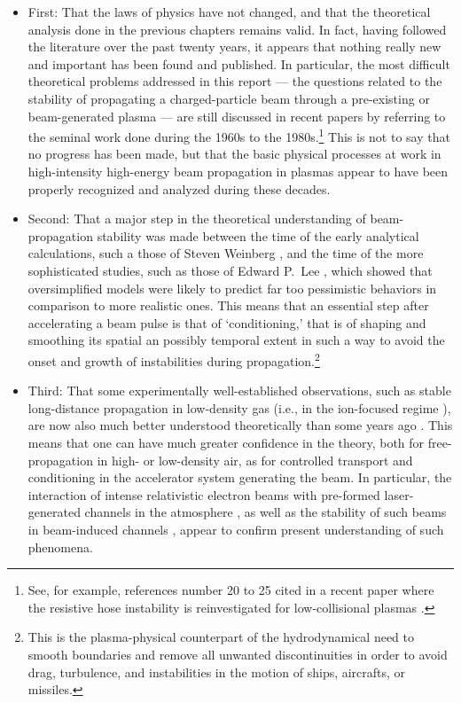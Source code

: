 \documentclass [12pt,a4paper,     ]{report} %
\begin{document}
\begin{itemize}

\item First:  That the laws of physics have not changed, and that the theoretical analysis done in the previous chapters remains valid.  In fact, having followed the literature over the past twenty years, it appears that nothing really new and important has been found and published.  In particular, the most difficult theoretical problems addressed in this report --- the questions related to the stability of propagating a charged-particle beam through a pre-existing or beam-generated plasma --- are still discussed in recent papers by referring to the seminal work done during the 1960s to the 1980s.\footnote{See, for example, references number 20 to 25 cited in a recent paper where the resistive hose instability is reinvestigated for low-collisional plasmas \cite{UHM--2003-}.}  This is not to say that no progress has been made, but that the basic physical processes at work in high-intensity high-energy beam propagation in plasmas appear to have been properly recognized and analyzed during these decades.

\item Second: That a major step in the theoretical understanding of beam-propa\-ga\-tion stability was made between the time of the early analytical calculations, such a those of Steven Weinberg \cite{WEINB1967-}, and the time of  the more sophisticated studies, such as those of Edward P.\ Lee \cite{LEE--1978-}, which showed that oversimplified models were likely to predict far too pessimistic behaviors in comparison to more realistic ones.  This means that an essential step after accelerating a beam pulse is that of `conditioning,' that is of shaping and smoothing its spatial an possibly temporal extent in such a way to avoid the onset and growth of instabilities during propagation.\footnote{This is the plasma-physical counterpart of the hydrodynamical need to smooth boundaries and remove all unwanted discontinuities in order to avoid drag, turbulence, and instabilities in the motion of ships, aircrafts, or missiles.}


\item Third: That some experimentally well-established observations, such as stable long-distance propagation in low-density gas (i.e., in the ion-focused regime \cite{BRIGG1981-}), are now also much better understood theoretically than some years ago \cite{BUCHA1987-}.  This means that one can have much greater confidence in the theory, both for free-propagation in high- or low-density air, as for controlled transport and conditioning in the accelerator system generating the beam. In particular, the interaction of intense relativistic electron beams with pre-formed laser-generated channels in the atmosphere \cite{MURPH1987-, MURPH1992-}, as well as the stability of such beams in beam-induced channels \cite{NGUYE1987-,WHITT1991-}, appear to confirm present understanding of such phenomena.



\end{itemize}
\end{document}
